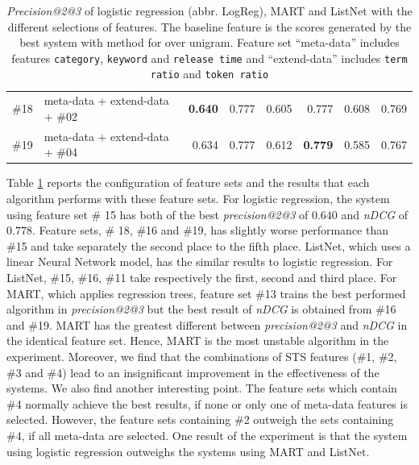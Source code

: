 \begin{table}[!hbt]
{\begin{tabularx}{1\textwidth}{lX|rr|rr|rr}
\#18 & meta-data + extend-data + \#02 & \textbf{0.640} &  0.777 & 0.605 & 0.777 & 0.608 & 0.769\\
\#19 & meta-data + extend-data + \#04 & 0.634 & 0.777 & 0.612 & \textbf{0.779} & 0.585 & 0.767 \\ \hline
\end{tabularx}
}
\caption[\textit{Precision@2@3} and \textit{nDCG} of logistic regression, MART and ListNet with the different selections of features in 5-fold cross validation]{\textit{Precision@2@3} of logistic regression (abbr. LogReg), MART and ListNet with the different selections of features. The baseline feature is the scores generated by the best system with method \tfidf{} for \icontent{} over unigram. Feature set ``meta-data'' includes features \texttt{category}, \texttt{keyword} and \texttt{release time} and ``extend-data'' includes \texttt{term ratio} and \texttt{token ratio}}
\label{tab:supervised}
\end{table}

\clearpage

Table \ref{tab:supervised} reports the configuration of feature sets and the results that each algorithm performs with these feature sets. For logistic regression, the system using feature set \# 15 has both of the best \textit{precision@2@3} of $0.640$ and \textit{nDCG} of $0.778$. Feature sets, \# 18, \#16 and \#19, has slightly worse performance than \#15 and take separately the second place to the fifth place. ListNet, which uses a linear Neural Network model, has the similar results to logistic regression. For ListNet, \#15, \#16, \#11 take respectively the first, second and third place. For MART, which applies regression trees, feature set \#13 trains the best performed algorithm in \textit{precision@2@3} but the best result of \textit{nDCG} is obtained from \#16 and \#19. MART has the greatest different between \textit{precision@2@3} and \textit{nDCG} in the identical feature set. Hence, MART is the most unstable algorithm in the experiment. Moreover, we find that the combinations of STS features (\#1, \#2, \#3 and \#4) lead to an insignificant improvement in the effectiveness of the systems. We also find another interesting point. The feature sets which contain \#4 normally achieve the best results, if none or only one of meta-data features is selected. However, the feature sets containing \#2 outweigh the sets containing \#4, if all meta-data are selected. One result of the experiment is that the system using logistic regression outweighs the systems using MART and ListNet.

